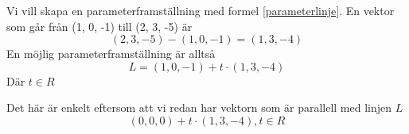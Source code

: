 \documentclass[../../main.tex]{subfiles}
\begin{document}
\begin{solution}{7}
Vi vill skapa en parameterframställning med formel \ref{parameterlinje}. En vektor som går från (1, 0, -1) till (2, 3, -5) är
\[(2, 3, -5) - (1, 0, -1) = (1, 3, -4)\]
En möjlig parameterframställning är alltså 
\[L = (1, 0, -1) + t \cdot (1, 3, -4)\]
Där $t \in R$

Det här är enkelt eftersom att vi redan har vektorn som är parallell med linjen $L$
\[(0, 0, 0) + t \cdot (1, 3, -4), t \in R\]

\end{solution}
\end{document}
